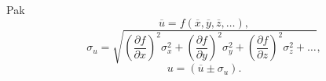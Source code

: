 \documentclass[english]{article}
\begin{document}
	Pak
	\begin{displaymath}
	\overline{u} = f(\overline{x}, \overline{y}, \overline{z}, \ldots),
	\end{displaymath}
	\begin{equation}\label{eq:chyba_neprime_mereni}
	\sigma_u = \sqrt{\left( \frac{\partial f}{\partial x} \right)^2 \sigma^2_x + \left( \frac{\partial f}{\partial y} \right)^2 \sigma^2_y + \left( \frac{\partial f}{\partial z} \right)^2 \sigma^2_z + \ldots},
	\end{equation}
	\begin{displaymath}
	u = (\overline{u} \pm \sigma_ u).
	\end{displaymath}
%	
%	 
%	
%	 
%
%
	
\end{document}
